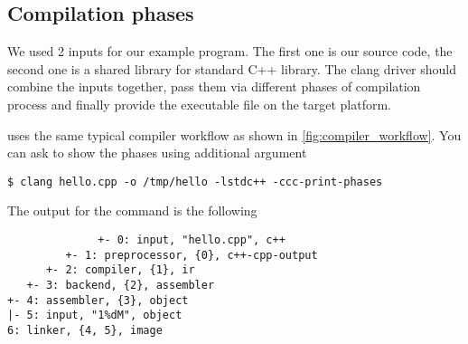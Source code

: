 \subsection{Compilation phases}
We used 2 inputs for our example program. The first one is our source code, the
second one is a shared library for standard C++ library. The clang driver should
combine the inputs together, pass them via different phases of compilation
process and finally provide the executable file on the target platform.

\clang uses the same typical compiler workflow as shown in \cref{fig:compiler_workflow}. You can
ask \clang to show the phases using  additional
argument
\begin{adjustwidth}{0em}{0em}
\begin{verbatim}
$ clang hello.cpp -o /tmp/hello -lstdc++ -ccc-print-phases
\end{verbatim}
\end{adjustwidth}
The output for the command is the following
\begin{adjustwidth}{0em}{0em}
\begin{verbatim}
              +- 0: input, "hello.cpp", c++
         +- 1: preprocessor, {0}, c++-cpp-output
      +- 2: compiler, {1}, ir
   +- 3: backend, {2}, assembler
+- 4: assembler, {3}, object
|- 5: input, "1%dM", object
6: linker, {4, 5}, image
\end{verbatim}
\end{adjustwidth}

